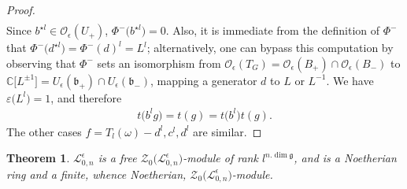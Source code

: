 \documentclass[pdftex]{sigma}
\numberwithin{equation}{section}
\newtheorem{teo}{Theorem}[section]
\theoremstyle{definition}
\newcommand{\e}{\epsilon}
\newcommand{\mc}{\mathbb{C}}
\newcommand{\Ll}{{\mathcal L}}
\newcommand{\Oo}{{\mathcal O}}
\begin{document}
\begin{proof}
\begin{align*}
 \end{align*}
Since $b^{\star l}\in \Oo_\e(U_+)$, $\Phi^-\big(b^{\star l}\big)=0$. Also, it is immediate from the definition of $\Phi^-$ that $\Phi^-\big(d^{\star l}\big) = \Phi^-(d)^l = L^{l}$; alternatively, one can bypass this computation by observing that $\Phi^-$ sets an isomorphism from $\Oo_\e(T_G) = \Oo_\e(B_+)\cap \Oo_\e(B_-)$ to $\mc\big[L^{\pm 1}\big] = U_\e(\mathfrak{b}_+)\cap U_\e(\mathfrak{b}_-)$, mapping a generator $d$ to $L$ or $L^{-1}$. We have $\varepsilon\big(L^l\big)=1$, and therefore
\begin{align*}
t\big(b^lg\big) = t(g) = t\big(b^l\big)t(g).
 \end{align*}
The other cases $f=T_l(\omega)-d^l, c^l,d^l$ are similar.
\end{proof}

\begin{teo} \label{modZ0} $\Ll_{0,n}^\e$ is a free $\mathcal{Z}_0\bigl(\Ll_{0,n}^\e\bigr)$-module of rank $l^{n.\dim \mathfrak{g}}$, and \smash{$\bigl(\Ll_{0,n}^\e\bigr)^{U_\e}$} is a Noetherian ring and a finite, whence Noetherian, $\mathcal{Z}_0\bigl(\Ll_{0,n}^\e\bigr)$-module.
\end{teo}
\end{document}
